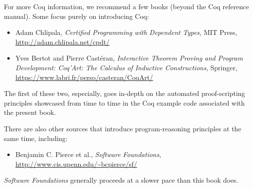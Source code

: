 \documentclass{amsbook}
\theoremstyle{definition}
\theoremstyle{remark}
\numberwithin{section}{chapter}
\numberwithin{equation}{chapter}
\begin{document}
For more Coq information, we recommend a few books (beyond the Coq reference manual).  Some focus purely on introducing Coq:

\begin{itemize}
  \item Adam Chlipala, \emph{Certified Programming with Dependent Types}, MIT Press, \url{http://adam.chlipala.net/cpdt/}
  \item Yves Bertot and Pierre Cast\'eran, \emph{Interactive Theorem Proving and Program Development: Coq'Art: The Calculus of Inductive Constructions}, Springer, \url{https://www.labri.fr/perso/casteran/CoqArt/}
\end{itemize}

The first of these two, especially, goes in-depth on the automated proof-scripting principles showcased from time to time in the Coq example code associated with the present book.

There are also other sources that introduce program-reasoning principles at the same time, including:

\begin{itemize}
  \item Benjamin C. Pierce et al., \emph{Software Foundations}, \url{http://www.cis.upenn.edu/~bcpierce/sf/}
\end{itemize}

\emph{Software Foundations} generally proceeds at a slower pace than this book does.

\backmatter
\printindex
\end{document}
